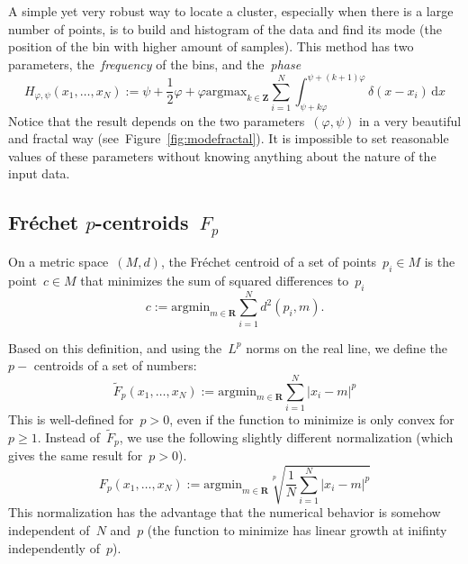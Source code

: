 \documentclass[a4paper]{article}
\def\R{\mathbf{R}}
\def\Z{\mathbf{Z}}
\def\d{\mathrm{d}}
\begin{document}
A simple yet very robust way to locate a cluster, especially when
there is a large number of points, is to build and histogram of the
data and find its mode (the position of the bin with higher amount of
samples).  This method has two parameters, the~\emph{frequency} of the bins,
and the~\emph{phase}
\[
	H_{\varphi,\psi}(x_1,\ldots,x_N) :=
	\psi+\frac{1}{2}\varphi+\varphi\mathrm{argmax}_{k\in\Z}
	\sum_{i=1}^N\int_{\psi+k\varphi}^{\psi+(k+1)\varphi}
	\delta(x-x_i)\,\d x
\]
Notice
that the result depends on the two parameters~$(\varphi,\psi)$ in a
very beautiful and fractal way (see~Figure~\ref{fig:modefractal}).
It is impossible to set reasonable values of these parameters without
knowing anything about the nature of the input data.


\subsection{Fréchet $p$-centroids~$F_p$}

On a metric space~$(M,d)$, the Fréchet centroid of a set of
points~$p_i\in M$ is the point~$c\in M$ that minimizes the sum of
squared differences to~$p_i$
\[
	c := \mathrm{argmin}_{m\in\R}\sum_{i=1}^N d^2(p_i,m).
\]

Based on this definition, and using the~$L^p$ norms on the real line,
we define the~$p-$ centroids of a set of numbers:
\[
	\tilde F_p(x_1,\ldots,x_N) := \mathrm{argmin}_{m\in\R}\sum_{i=1}^N|x_i-m|^p
\]
This is well-defined for~$p>0$, even if the function to minimize is
only convex for~$p\ge1$.  Instead of~$\tilde F_p$, we use the
following slightly different normalization (which gives the same result for~$p>0$).
\[
	F_p(x_1,\ldots,x_N) :=
	\mathrm{argmin}_{m\in\R}\sqrt[p]{\frac{1}{N}\sum_{i=1}^N|x_i-m|^p}
\]
This normalization has the advantage that the numerical behavior is
somehow independent of~$N$ and~$p$  (the function to minimize has
linear growth at inifinty independently of~$p$).
\end{document}
